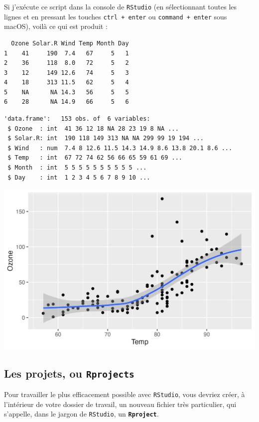 \documentclass[
  letterpaper,
  DIV=11,
  numbers=noendperiod]{scrreprt}
\begin{document}
Si j'exécute ce script dans la console de \texttt{RStudio} (en
sélectionnant toutes les lignes et en pressant les touches
\texttt{ctrl\ +\ enter} ou \texttt{command\ +\ enter} sous macOS), voilà
ce qui est produit :

\begin{verbatim}
  Ozone Solar.R Wind Temp Month Day
1    41     190  7.4   67     5   1
2    36     118  8.0   72     5   2
3    12     149 12.6   74     5   3
4    18     313 11.5   62     5   4
5    NA      NA 14.3   56     5   5
6    28      NA 14.9   66     5   6
\end{verbatim}

\begin{verbatim}
'data.frame':   153 obs. of  6 variables:
 $ Ozone  : int  41 36 12 18 NA 28 23 19 8 NA ...
 $ Solar.R: int  190 118 149 313 NA NA 299 99 19 194 ...
 $ Wind   : num  7.4 8 12.6 11.5 14.3 14.9 8.6 13.8 20.1 8.6 ...
 $ Temp   : int  67 72 74 62 56 66 65 59 61 69 ...
 $ Month  : int  5 5 5 5 5 5 5 5 5 5 ...
 $ Day    : int  1 2 3 4 5 6 7 8 9 10 ...
\end{verbatim}

\includegraphics{./01-R-basics_files/figure-pdf/unnamed-chunk-3-1.png}

\hypertarget{les-projets-ou-rprojects}{%
\subsection{\texorpdfstring{Les projets, ou
\texttt{Rprojects}}{Les projets, ou Rprojects}}\label{les-projets-ou-rprojects}}

Pour travailler le plus efficacement possible avec \texttt{RStudio},
vous devriez créer, à l'intérieur de votre dossier de travail, un
nouveau fichier très particulier, qui s'appelle, dans le jargon de
\texttt{RStudio}, un \textbf{\texttt{Rproject}}.
\end{document}
